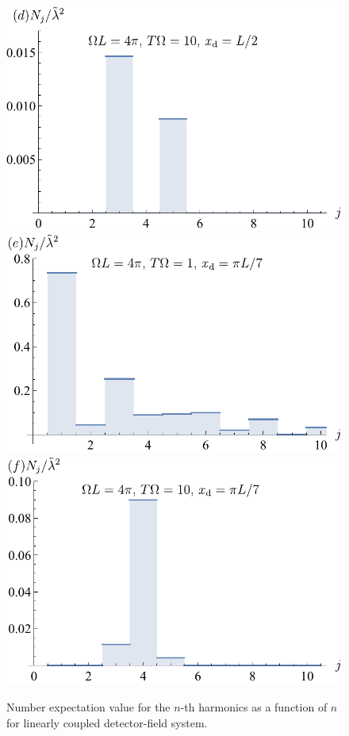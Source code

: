 \documentclass[11pt,prd,onecolumn,superscriptaddress,nofootinbib,floatfix,amsmath,amssymb]{revtex4-2}
\begin{document}
\begin{figure}[tp]
        \includegraphics[scale=0.5]{Fig7d.pdf}
        \includegraphics[scale=0.5]{Fig7e.pdf}
        \includegraphics[scale=0.5]{Fig7f.pdf}
        \caption{Number expectation value for the $n$-th harmonics as a function of $n$ for linearly coupled detector-field system.} %
        \label{fig: lineardeposit1}
    \end{figure}
    
\end{document}
